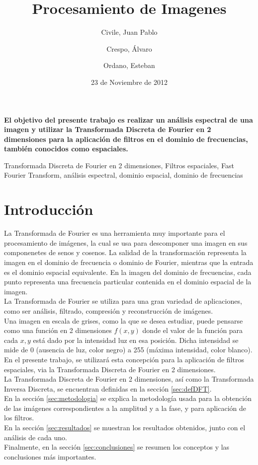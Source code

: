 \documentclass[twocolumn,a4paper,10pt]{article}
\title{Procesamiento de Imagenes}
\date{23 de Noviembre de 2012}
\author{Civile, Juan Pablo \and Crespo, Álvaro \and Ordano, Esteban }
\begin{document}
\pagestyle{fancy}
\maketitle
\thispagestyle{fancy}

\begin{customabstract}
\textbf{
El objetivo del presente trabajo es realizar un an\'alisis espectral de una imagen y utilizar la Transformada Discreta de Fourier en 2 dimensiones para 
la aplicaci\'on de filtros en el dominio de frecuencias, también conocidos como espaciales.
}
\end{customabstract}

\begin{keywords}
Transformada Discreta de Fourier en 2 dimensiones, Filtros espaciales, Fast Fourier Transform, an\'alisis espectral, dominio espacial, dominio de frecuencias
\end{keywords}

\section{Introducci\'on}

La Transformada de Fourier es una herramienta muy importante para el procesamiento de im\'agenes, la cual se usa para descomponer una imagen en sus 
componenetes de senos y cosenos. La salidad de la transformaci\'on representa la imagen en el dominio de frecuencia o dominio de Fourier, mientras 
que la entrada es el dominio espacial equivalente. En la imagen del dominio de frecuencias, cada punto representa una frecuencia particular contenida en el 
dominio espacial de la imagen. \\

La Transformada de Fourier se utiliza para una gran variedad de aplicaciones, como ser an\'alisis, filtrado, compresi\'on y reconstrucci\'on de im\'agenes. \\

Una imagen en escala de grises, como la que se desea estudiar, puede pensarse como una funci\'on en 2 dimensiones $f(x,y)$ donde el valor de la función
para cada $x,y$ está dado por la intensidad luz en esa posici\'on. Dicha intensidad se mide de 0 (ausencia de luz, color negro) a 255 (m\'axima intensidad, 
color blanco). En el presente trabajo, se utilizará esta concepci\'on para la aplicaci\'on de filtros espaciales, via la 
Transformada Discreta de Fourier en 2 dimensiones. \\

La Transformada Discreta de Fourier en 2 dimensiones, así como la Transformada Inversa Discreta, se encuentran definidas en la secci\'on 
\ref{sec:defDFT}.\\
En la secci\'on \ref{sec:metodologia} se explica la metodolog\'ia usada para la obtenci\'on de las im\'agenes correspondientes a la amplitud 
y a la fase, y para aplicaci\'on de los filtros. \\
En la secci\'on \ref{sec:resultados} se muestran los resultados obtenidos, junto con el an\'alisis de cada uno. \\
Finalmente, en la secci\'on \ref{sec:conclusiones} se resumen los conceptos y las conclusiones m\'as importantes. \\
\end{document}
